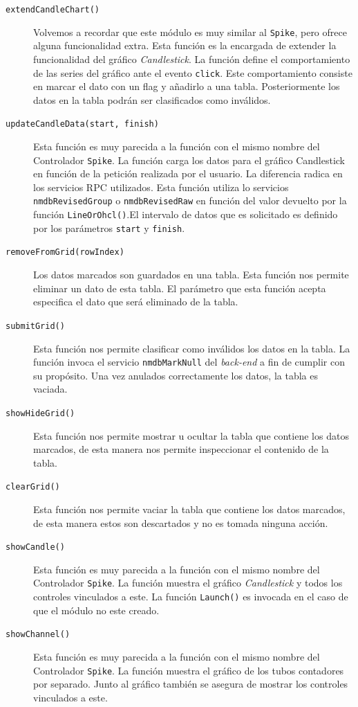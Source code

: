 \begin{description}
			\item[\texttt{extendCandleChart()}]
				Volvemos a recordar que este módulo es muy similar al \texttt{Spike}, pero ofrece alguna funcionalidad extra. Esta
				función es la encargada de extender la funcionalidad del gráfico \emph{Candlestick}. La función define el
				comportamiento de las series del gráfico ante el evento \texttt{click}. Este comportamiento consiste en marcar el dato
				con un flag y añadirlo a una tabla.  Posteriormente los datos en la tabla podrán ser clasificados como inválidos. 
			\item[\texttt{updateCandleData(start, finish)}]
				Esta función es muy parecida a la función con el mismo nombre del Controlador \texttt{Spike}. La función carga los
				datos para el gráfico Candlestick en función de la petición realizada por el usuario. La diferencia radica en los
				servicios RPC utilizados. Esta función utiliza lo servicios \texttt{nmdbRevisedGroup} o \texttt{nmdbRevisedRaw} en
				función del valor devuelto por la función \texttt{LineOrOhcl()}.El intervalo de datos que es solicitado es definido
				por los parámetros \texttt{start} y \texttt{finish}.
			\item[\texttt{removeFromGrid(rowIndex)}]
				Los datos marcados son guardados en una tabla. Esta función nos permite eliminar un dato de esta tabla. El parámetro
				que esta función acepta especifica el dato que será eliminado de la tabla. 
			\item[\texttt{submitGrid()}]
				Esta función nos permite clasificar como inválidos los datos en la tabla. La función invoca el servicio
				\texttt{nmdbMarkNull} del \emph{back-end} a fin de cumplir con su propósito. Una vez anulados correctamente los datos,
				la tabla es vaciada.
			\item[\texttt{showHideGrid()}]
				Esta función nos permite mostrar u ocultar la tabla que contiene los datos marcados, de esta manera nos permite
				inspeccionar el contenido de la tabla.
			\item[\texttt{clearGrid()}]
				Esta función nos permite vaciar la tabla que contiene los datos marcados, de esta manera estos son descartados y no es
				tomada ninguna acción.
			\item[\texttt{showCandle()}]
				Esta función es muy parecida a la función con el mismo nombre del Controlador \texttt{Spike}. La función muestra el
				gráfico \emph{Candlestick} y todos los controles vinculados a este. La función \texttt{Launch()} es invocada en el
				caso de que el módulo no este creado.
			\item[\texttt{showChannel()}]
				Esta función es muy parecida a la función con el mismo nombre del Controlador \texttt{Spike}. La función muestra el
				gráfico de los tubos contadores por separado. Junto al gráfico también se asegura de mostrar los controles vinculados
				a este.		
		\end{description}
